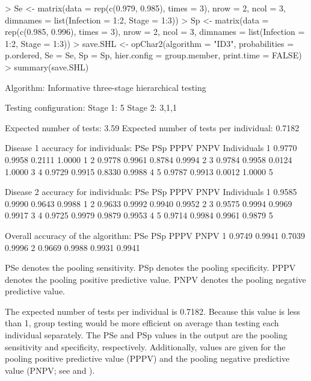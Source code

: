 \begin{Schunk}
\begin{Sinput}
> Se <- matrix(data = rep(c(0.979, 0.985), times = 3), nrow = 2, ncol = 3,
     dimnames = list(Infection = 1:2, Stage = 1:3))
> Sp <- matrix(data = rep(c(0.985, 0.996), times = 3), nrow = 2, ncol = 3,
     dimnames = list(Infection = 1:2, Stage = 1:3))
> save.SHL <- opChar2(algorithm = "ID3", probabilities = p.ordered, Se = Se,
     Sp = Sp, hier.config = group.member, print.time = FALSE)
> summary(save.SHL)
\end{Sinput}
\begin{Soutput}

Algorithm: Informative three-stage hierarchical testing 

Testing configuration:
Stage 1: 5
Stage 2: 3,1,1

Expected number of tests: 3.59
Expected number of tests per individual: 0.7182

Disease 1 accuracy for individuals:
     PSe    PSp   PPPV   PNPV Individuals
1 0.9770 0.9958 0.2111 1.0000           1
2 0.9778 0.9961 0.8784 0.9994           2
3 0.9784 0.9958 0.0124 1.0000           3
4 0.9729 0.9915 0.8330 0.9988           4
5 0.9787 0.9913 0.0012 1.0000           5

Disease 2 accuracy for individuals:
     PSe    PSp   PPPV   PNPV Individuals
1 0.9585 0.9990 0.9643 0.9988           1
2 0.9633 0.9992 0.9940 0.9952           2
3 0.9575 0.9994 0.9969 0.9917           3
4 0.9725 0.9979 0.9879 0.9953           4
5 0.9714 0.9984 0.9961 0.9879           5

Overall accuracy of the algorithm:
     PSe    PSp   PPPV   PNPV
1 0.9749 0.9941 0.7039 0.9996
2 0.9669 0.9988 0.9931 0.9941

PSe denotes the pooling sensitivity.
PSp denotes the pooling specificity.
PPPV denotes the pooling positive predictive value.
PNPV denotes the pooling negative predictive value.
\end{Soutput}
\end{Schunk}

 The expected number of tests per individual is 0.7182. Because
this value is less than 1, group testing would be more efficient on average
than testing each individual separately. The PSe and PSp values in
the output are the pooling sensitivity and specificity, respectively.
Additionally, values are given for the pooling positive predictive
value (PPPV) and the pooling negative predictive value (PNPV; see
\citet{altman1994statistics} and \citet{hitt2019objective}).

